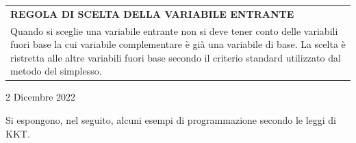 \documentclass[a4paper]{extarticle}
\renewcommand\arraystretch{}
\begin{document}
\vspace{1em}
\setlength{\tabcolsep}{14pt}
\renewcommand{\arraystretch}{2}
\noindent
\begin{tabularx}{\textwidth}{@{}|P|@{}}
    \hline
    {\textbf{REGOLA DI SCELTA DELLA VARIABILE ENTRANTE}}\\
    \parbox{\linewidth}{Quando si sceglie una variabile entrante non si deve tener conto delle variabili fuori base la cui variabile complementare è già una variabile di base. La scelta è ristretta alle altre variabili fuori base secondo il criterio standard utilizzato dal metodo del simplesso. \vspace{3mm}}\\
    \hline
\end{tabularx}

\newpage
\begin{center}
    2 Dicembre 2022
\end{center}
\vspace{1em}
\noindent
Si espongono, nel seguito, alcuni esempi di programmazione secondo le leggi di KKT.
\end{document}
